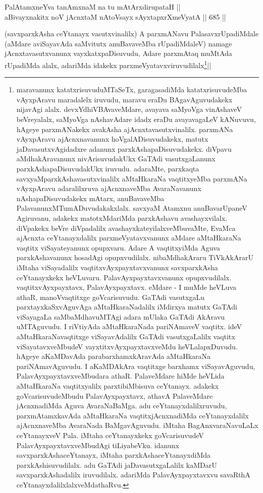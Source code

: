 
\begin{shl}
PalAtamxneYva tanAmxnaM na tu mAtArxdirupataH || \\
aBivayxnakitx noV jAcnxtaM nAtoV\s sayx sAyxtapxrXmeVyatA ||  685 ||  
\end{shl}

\begin{artha} 
(savxparxkAsha ceYtanayx vasutxvinalilx) A parxmANavu 
PalasavxrUpadiMdale (aMdare aviSayavAda saMvitutx anuBavaveMba 
rUpadiMdaleV) namage jAcnxtavasutxvanunx vayxkatxpaDisuvudu, Adare 
parxmAtaq muMtAda rUpadiMda alalx, adariMda idakekx 
parxmeVyatavxviruvudilalx\footnote[1]{maravanunx 
katatxrisuvuduMTaSeTx, garagasadiMda katatxrisuvudeMba vAyxpAravu 
maradalelx iruvudu, maravu eraDu BAgavAguvudakekx nijavAgi alalx. 
devxYdhiVBAvaveMdare, avayava saMyoVga vinAshaveV beVreyalalx, 
saMyoVga nAshavAdare idadx eraDu avayavagaLeV kANuvuvu, hAgeye 
parxmANakekx avakAsha ajAcnxtavasutxvinalilx. parxmANa vAyxpAravu 
ajAcnxnavanunx hoVgalADisuvudakekx, matutx jaDavasutxvAgidadxre 
adanunx parxkAshapaDisuvudakekx. diVpavu aMdhakAravanunx 
nivArisuvudakUkx GaTAdi vasutxgaLanunx parxkAshapaDisuvudakUkx 
iruvudu. adaraMte, parxkaqta savxyaMparxkAshavasutxvinalilx 
aMtaHkaraNa vaqtitxyeMba parxmANa vAyxpAravu adaralilxruva 
ajAcnxnaveMba AvaraNavanunx nAshapaDisuvudakekx mAtarx, anuBavaveMba 
PalavanunxMTumADuvudakakxlalx. savxyaM Atamxnu anuBavarUpaneV 
Agiruvanu, adakekx matotxMdariMda parxkAshavu avashayxvilalx. 
diVpakekx beVre diVpadalilx avashayxkateyilalxveMbuvaMte, EvaMca 
ajAcnxta ceYtanayxdalilx parxmeVyatavxvanunx aMdare aMtaHkaraNa 
vaqtitx viSayateyanunx opupxvaru. Adare A vaqtitxyiMda Aguva 
parxkAshavanunx hosadAgi opupxvudilalx. nibaMdhakAraru TiVkAkArarU 
iMtaha viSayadalilx vaqtitxvAyxpayxtavxvanunx savxparxkAsha 
ceYtanayxkekx heVLuvaru. PalavAyxpayxtavxvanunx opupxvudilalx. 
vaqtitxvAyxpayxtavx, PalavAyxpayxtavx. eMdare - I muMde heVLuva athaR, 
manoVvaqtitxge goVcarisuvudu. GaTAdi vasutxgaLu parxtayxkaSxvAguvAga 
aMtaHkaraNadalilx iMdirxya matutx GaTAdi viSayagaLa saMbaMdhavuMTAgi 
adara mUlaka GaTAdi AkAravu uMTAguvudu. I riVtiyAda aMtaHkaraNada 
pariNAmaveV vaqtitx. ideV aMtaHkaraNavaqtitxge viSayavAdalilx GaTAdi 
vasutxgaLalilx vaqtitx viSayatavxveMbudeV vayxtitxvAyxpayxtavxveMdu 
heVLalapxDuvudu. hAgeye aKaMDavAda parabarxhamxkAravAda aMtaHkaraNa 
pariNAmavAguvudu. I aKaMDAkAra vaqtitxge barxhamx viSayavAguvudu, 
PalavAyxpayxtavxveMbudara athaR. PalaveMdare hiMde heVLida aMtaHkaraNa 
vaqtitxyalilx parxtibiMbisuva ceYtanayx. adakekx goVcarisuvudeMbudu 
PalavAyxpayxtavx, athavA PalaveMdare jAcnxnadiMda Aguva AvaraNaBaMga. 
adu ceYtanayxdalilxruvudu, parxmAtamxkavAda aMtaHkaraNa 
vaqtitxjAcnxnadiMda ceYtanayxdalilx ajAcnxnaveMba AvaraNada 
BaMgavAguvudu. iMtaha BagAnxvaraNavuLaLx ceYtanayxveV Pala. iMtaha 
ceYtanayxkekx goVcarisuvudeV PalavAyxpayxtavxveMbudAgi tiLiyabeVku. 
idanunx savxparxkAshaceYtanayx, iMtaha parxkAshaceYtanayxdiMda 
parxkAshisuvudilalx. adu GaTAdi jaDavasutxgaLalilx kaMDarU 
savxparxkAshadalilx iruvudilalx. adariMda PalavAyxpayxtavxvu savaRthA 
ceYtanayxdalilxlalxveMdathaRvu.}||
\end{artha}

